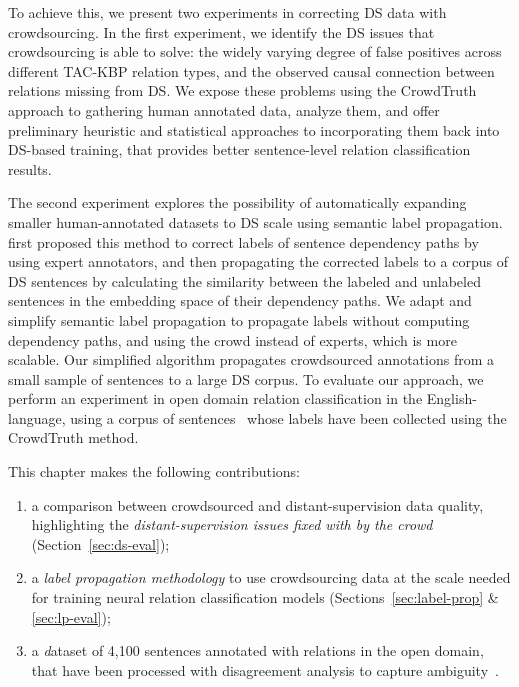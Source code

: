 To achieve this, we present two experiments in correcting DS data with crowdsourcing. In the first experiment, we identify the DS issues that crowdsourcing is able to solve: the widely varying degree of false positives across different TAC-KBP relation types, and the observed causal connection between relations missing from DS. We expose these problems using the CrowdTruth~\cite{aroyo2014threesides,aroyo2015truth,aroyo2013crowd} approach to gathering human annotated data, analyze them, and offer preliminary heuristic and statistical approaches to incorporating them back into DS-based training, that provides better sentence-level relation classification results. %

The second experiment explores the possibility of automatically expanding smaller human-annotated datasets to DS scale using semantic label propagation. \citet{sterckx2016knowledge} first proposed this method to correct labels of sentence dependency paths by using expert annotators, and then propagating the corrected labels to a corpus of DS sentences by calculating the similarity between the labeled and unlabeled sentences in the embedding space of their dependency paths. We adapt and simplify semantic label propagation to propagate labels without computing dependency paths, and using the crowd instead of experts, which is more scalable. Our simplified algorithm propagates crowdsourced annotations from a small sample of sentences to a large DS corpus. To evaluate our approach, we perform an experiment in open domain relation classification in the English-language, using a corpus of sentences~\cite{crowdODrelexdata2016} whose labels have been collected using the CrowdTruth method.

This chapter makes the following contributions:

\begin{enumerate}
    \item a comparison between crowdsourced and distant-supervision data quality, highlighting the \textit{distant-supervision issues fixed with by the crowd} (Section~\ref{sec:ds-eval});
    
    \item a \textit{label propagation methodology} to use crowdsourcing data at the scale needed for training neural relation classification models (Sections~\ref{sec:label-prop} \& \ref{sec:lp-eval});
    
    \item a {\textit dataset of 4,100 sentences annotated with relations in the open domain}, that have been processed with disagreement analysis to capture ambiguity~\cite{crowdODrelexdata2016}.
\end{enumerate}

